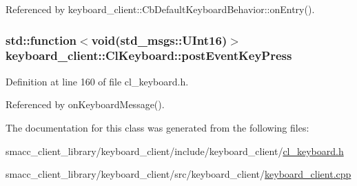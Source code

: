 Referenced by keyboard\+\_\+client\+::\+Cb\+Default\+Keyboard\+Behavior\+::on\+Entry().

\subsubsection[{\texorpdfstring{post\+Event\+Key\+Press}{postEventKeyPress}}]{\setlength{\rightskip}{0pt plus 5cm}std\+::function$<$void(std\+\_\+msgs\+::\+U\+Int16)$>$ keyboard\+\_\+client\+::\+Cl\+Keyboard\+::post\+Event\+Key\+Press}\hypertarget{classkeyboard__client_1_1ClKeyboard_aadd675eea47a012b348a4e6c00e7e9d0}{}\label{classkeyboard__client_1_1ClKeyboard_aadd675eea47a012b348a4e6c00e7e9d0}


Definition at line 160 of file cl\+\_\+keyboard.\+h.



Referenced by on\+Keyboard\+Message().



The documentation for this class was generated from the following files\+:\begin{DoxyCompactItemize}
\item 
smacc\+\_\+client\+\_\+library/keyboard\+\_\+client/include/keyboard\+\_\+client/\hyperlink{cl__keyboard_8h}{cl\+\_\+keyboard.\+h}\item 
smacc\+\_\+client\+\_\+library/keyboard\+\_\+client/src/keyboard\+\_\+client/\hyperlink{keyboard__client_8cpp}{keyboard\+\_\+client.\+cpp}\end{DoxyCompactItemize}
